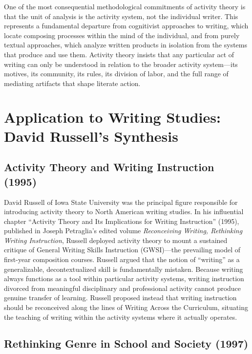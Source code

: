 \documentclass[12pt]{article}
\begin{document}
One of the most consequential methodological commitments of activity theory is that the unit of analysis is the activity system, not the individual writer. This represents a fundamental departure from cognitivist approaches to writing, which locate composing processes within the mind of the individual, and from purely textual approaches, which analyze written products in isolation from the systems that produce and use them. Activity theory insists that any particular act of writing can only be understood in relation to the broader activity system---its motives, its community, its rules, its division of labor, and the full range of mediating artifacts that shape literate action.

\section{Application to Writing Studies: David Russell's Synthesis}

\subsection{Activity Theory and Writing Instruction (1995)}

David Russell of Iowa State University was the principal figure responsible for introducing activity theory to North American writing studies. In his influential chapter ``Activity Theory and Its Implications for Writing Instruction'' (1995), published in Joseph Petraglia's edited volume \textit{Reconceiving Writing, Rethinking Writing Instruction}, Russell deployed activity theory to mount a sustained critique of General Writing Skills Instruction (GWSI)---the prevailing model of first-year composition courses. Russell argued that the notion of ``writing'' as a generalizable, decontextualized skill is fundamentally mistaken. Because writing always functions as a tool within particular activity systems, writing instruction divorced from meaningful disciplinary and professional activity cannot produce genuine transfer of learning. Russell proposed instead that writing instruction should be reconceived along the lines of Writing Across the Curriculum, situating the teaching of writing within the activity systems where it actually operates.

\subsection{Rethinking Genre in School and Society (1997)}
\end{document}
